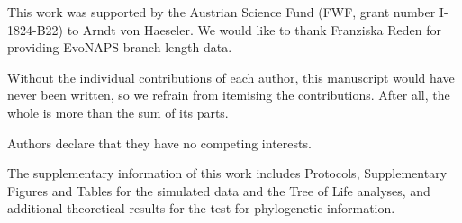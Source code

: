  This work was supported by the Austrian Science Fund (FWF, grant number I-1824-B22) to Arndt von Haeseler. We would like to thank Franziska Reden for providing EvoNAPS branch length data.

 {Without the individual contributions of each author, this manuscript would have never been written, so we refrain from itemising the contributions. After all, the whole is more than the sum of its parts.}

Authors declare that they have no competing interests.

The supplementary information of this work
includes  Protocols, Supplementary Figures and Tables for the simulated data and the Tree of Life analyses, and additional theoretical results for the test for phylogenetic information.


\resetsections 